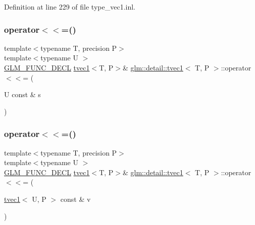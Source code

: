 Definition at line 229 of file type\+\_\+vec1.\+inl.

\mbox{\label{structglm_1_1detail_1_1tvec1_a52cec716d59902c6a42eeebd28f78de9}} 
\subsubsection{\texorpdfstring{operator$<$$<$=()}{operator<<=()}\hspace{0.1cm}{\footnotesize\ttfamily [1/4]}}
{\footnotesize\ttfamily template$<$typename T, precision P$>$ \\
template$<$typename U $>$ \\
\hyperlink{setup_8hpp_ab2d052de21a70539923e9bcbf6e83a51}{G\+L\+M\+\_\+\+F\+U\+N\+C\+\_\+\+D\+E\+CL} \hyperlink{structglm_1_1detail_1_1tvec1}{tvec1}$<$T, P$>$\& \hyperlink{structglm_1_1detail_1_1tvec1}{glm\+::detail\+::tvec1}$<$ T, P $>$\+::operator$<$$<$= (\begin{DoxyParamCaption}\item[{U const \&}]{s }\end{DoxyParamCaption})}

\mbox{\label{structglm_1_1detail_1_1tvec1_a12d03301e51ece6466714a8203f8b237}} 
\subsubsection{\texorpdfstring{operator$<$$<$=()}{operator<<=()}\hspace{0.1cm}{\footnotesize\ttfamily [2/4]}}
{\footnotesize\ttfamily template$<$typename T, precision P$>$ \\
template$<$typename U $>$ \\
\hyperlink{setup_8hpp_ab2d052de21a70539923e9bcbf6e83a51}{G\+L\+M\+\_\+\+F\+U\+N\+C\+\_\+\+D\+E\+CL} \hyperlink{structglm_1_1detail_1_1tvec1}{tvec1}$<$T, P$>$\& \hyperlink{structglm_1_1detail_1_1tvec1}{glm\+::detail\+::tvec1}$<$ T, P $>$\+::operator$<$$<$= (\begin{DoxyParamCaption}\item[{\hyperlink{structglm_1_1detail_1_1tvec1}{tvec1}$<$ U, P $>$ const \&}]{v }\end{DoxyParamCaption})}

